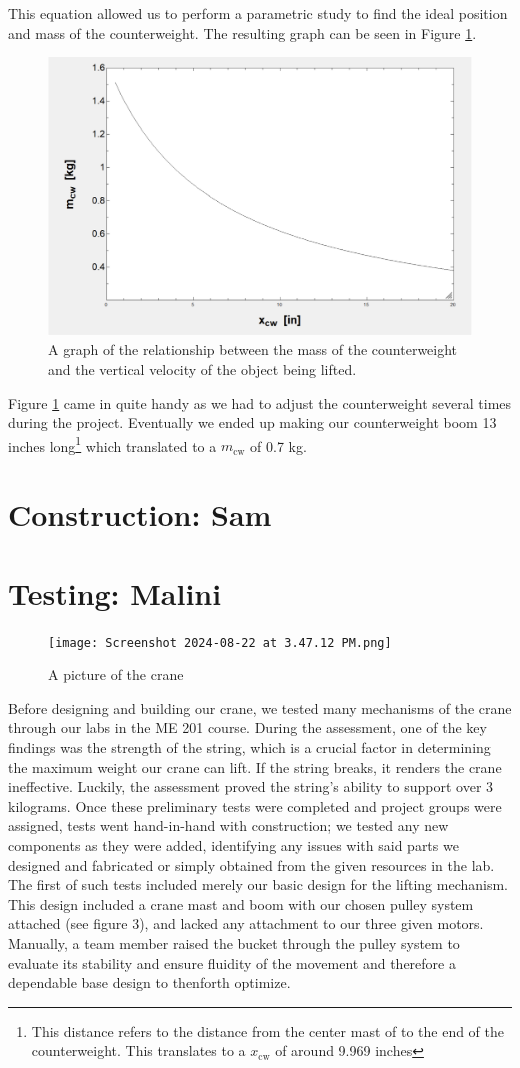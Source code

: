 \documentclass[letterpaper, 12pt]{article}
\begin{document}
This equation allowed us to perform a parametric study to find the ideal position and mass of the counterweight. The resulting graph can be seen in Figure \ref{fig:Counter Weight.png}.
\begin{figure}[H]
    \centering
    \includegraphics[width =.55\linewidth]{Counter Weight.png}
    \caption{A graph of the relationship between the mass of the counterweight and the vertical velocity of the object being lifted.}
    \label{fig:Counter Weight.png}
\end{figure}

Figure \ref{fig:Counter Weight.png} came in quite handy as we had to adjust the counterweight several times during the project.
Eventually we ended up making our counterweight boom 13 inches long\footnote{This distance refers to the distance from the center mast of to the end of the counterweight. This translates to a $x_{\text{cw}}$ of around 9.969 inches} which translated to a $m_{\text{cw}}$ of 0.7 kg.

\section{Construction: Sam }
\section{Testing: Malini}
\begin{figure}[H]
    \centering
    \texttt{[image: Screenshot 2024-08-22 at 3.47.12 PM.png]}
    \caption{A picture of the crane}
    \label{fig:pic of Crane}
\end{figure}

Before designing and building our crane, we tested many mechanisms of the crane through our labs in the ME 201 course. 
During the assessment, one of the key findings was the strength of the string, which is a crucial factor in determining the maximum weight our crane can lift. 
If the string breaks, it renders the crane ineffective.
Luckily, the assessment proved the string’s ability to support over 3 kilograms. 
Once these preliminary tests were completed and project groups were assigned, tests went hand-in-hand with construction; we tested any new components as they were added, identifying any issues with said parts we designed and fabricated or simply obtained from the given resources in the lab. 
The first of such tests included merely our basic design for the lifting mechanism. 
This design included a crane mast and boom with our chosen pulley system attached (see figure 3), and lacked any attachment to our three given motors. 
Manually, a team member raised the bucket through the pulley system to evaluate its stability and ensure fluidity of the movement and therefore a dependable base design to thenforth optimize. 
\end{document}
